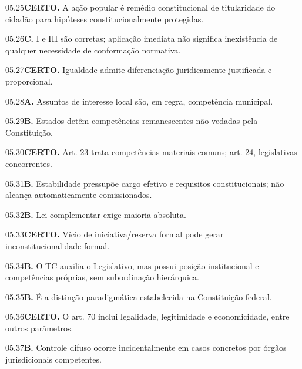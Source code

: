 \begin{solucao}{05.25}\textbf{CERTO.} A ação popular é remédio constitucional de titularidade do cidadão para hipóteses constitucionalmente protegidas.\end{solucao}
\begin{solucao}{05.26}\textbf{C.} I e III são corretas; aplicação imediata não significa inexistência de qualquer necessidade de conformação normativa.\end{solucao}
\begin{solucao}{05.27}\textbf{CERTO.} Igualdade admite diferenciação juridicamente justificada e proporcional.\end{solucao}
\begin{solucao}{05.28}\textbf{A.} Assuntos de interesse local são, em regra, competência municipal.\end{solucao}
\begin{solucao}{05.29}\textbf{B.} Estados detêm competências remanescentes não vedadas pela Constituição.\end{solucao}
\begin{solucao}{05.30}\textbf{CERTO.} Art. 23 trata competências materiais comuns; art. 24, legislativas concorrentes.\end{solucao}
\begin{solucao}{05.31}\textbf{B.} Estabilidade pressupõe cargo efetivo e requisitos constitucionais; não alcança automaticamente comissionados.\end{solucao}
\begin{solucao}{05.32}\textbf{B.} Lei complementar exige maioria absoluta.\end{solucao}
\begin{solucao}{05.33}\textbf{CERTO.} Vício de iniciativa/reserva formal pode gerar inconstitucionalidade formal.\end{solucao}
\begin{solucao}{05.34}\textbf{B.} O TC auxilia o Legislativo, mas possui posição institucional e competências próprias, sem subordinação hierárquica.\end{solucao}
\begin{solucao}{05.35}\textbf{B.} É a distinção paradigmática estabelecida na Constituição federal.\end{solucao}
\begin{solucao}{05.36}\textbf{CERTO.} O art. 70 inclui legalidade, legitimidade e economicidade, entre outros parâmetros.\end{solucao}
\begin{solucao}{05.37}\textbf{B.} Controle difuso ocorre incidentalmente em casos concretos por órgãos jurisdicionais competentes.\end{solucao}

